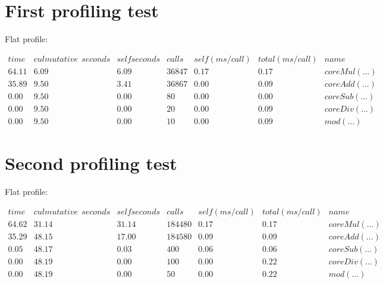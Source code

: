 \documentclass[11pt]{report}
\begin{document}
\section{First profiling test}
  Flat profile:

$\begin{array}{llllllll}
time & culmutative~~seconds & self seconds & calls & self (ms/call) & total (ms/call) & name\\
64.11 & 6.09 & 6.09 & 36847 & 0.17 & 0.17 & coreMul(...)\\
35.89 & 9.50 & 3.41 & 36867 & 0.00 & 0.09 & coreAdd(...)\\
0.00 & 9.50 & 0.00 & 80 & 0.00 & 0.00 & coreSub(...)\\
0.00 & 9.50 & 0.00 & 20 & 0.00 & 0.09 & coreDiv(...)\\
0.00 & 9.50 & 0.00 & 10 & 0.00 & 0.09 & mod(...)
\end{array}$

\section{Second profiling test}

  Flat profile:

$\begin{array}{lllllll}
time & culmutative~~seconds & self seconds & calls & self (ms/call) & total (ms/call) & name\\
64.62 & 31.14 & 31.14 & 184480 & 0.17 & 0.17 & coreMul(...)\\
35.29 & 48.15 & 17.00 & 184580 & 0.09 & 0.09 & coreAdd(...)\\
0.05 & 48.17 & 0.03 & 400 & 0.06 & 0.06 & coreSub(...)\\
0.00 & 48.19 & 0.00 & 100 & 0.00 & 0.22 & coreDiv(...)\\
0.00 & 48.19 & 0.00 & 50  & 0.00 & 0.22 & mod(...)
\end{array}$
\end{document}
